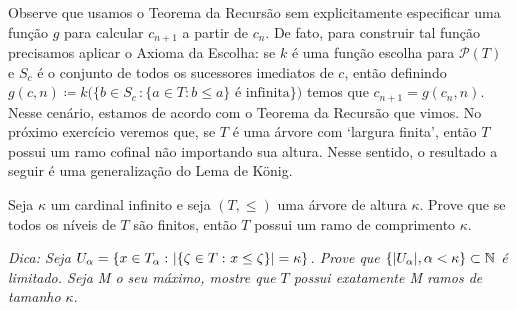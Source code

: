 \documentclass[a4paper]{article}
\begin{document}
    Observe que usamos o Teorema da Recursão sem
    explicitamente especificar uma função \(g\) para
    calcular \(c_{n+1}\) a partir de \(c_n\). De fato, para construir tal função precisamos
    aplicar o Axioma da Escolha: se \(k\) é uma função escolha para
    \(\mathcal{P}(T)\) e \(S_c\) é o conjunto de todos os sucessores imediatos
    de \(c\), então definindo \(g(c,n) \coloneqq k\big ( \{b\in S_c\,\colon
    \{a\in T: b\leq a\} \text{ é infinita}\}\big )\) temos que \(c_{n+1} =
    g(c_n, n)\). Nesse  cenário, estamos
    de acordo com o Teorema da Recursão que vimos. No próximo exercício veremos que,
    se \(T\) é uma árvore com `largura finita', então \(T\) possui um ramo
    cofinal não importando sua altura. Nesse sentido, o resultado a seguir é uma
    generalização do Lema de König.
  
\begin{exercicio}\label{3.3}
  Seja \(\kappa\) um cardinal infinito e seja \((T,\leq)\) uma árvore de altura
  \(\kappa\). Prove que se todos os níveis de \(T\) são finitos, então \(T\)
  possui um ramo de comprimento \(\kappa\).
  
  \emph{Dica: Seja \(U_\alpha=\{x\in T_\alpha\,\colon\vert \{\zeta\in T\,\colon x\leq\zeta\} \vert=\kappa\}\). Prove que
  \(\{\vert U_\alpha \vert,\alpha<\kappa\}\subset\mathbb{N}\) é limitado. Seja M o seu
  máximo, mostre que \(T\) possui exatamente M ramos de tamanho \(\kappa\)}.
\end{exercicio}
\end{document}
